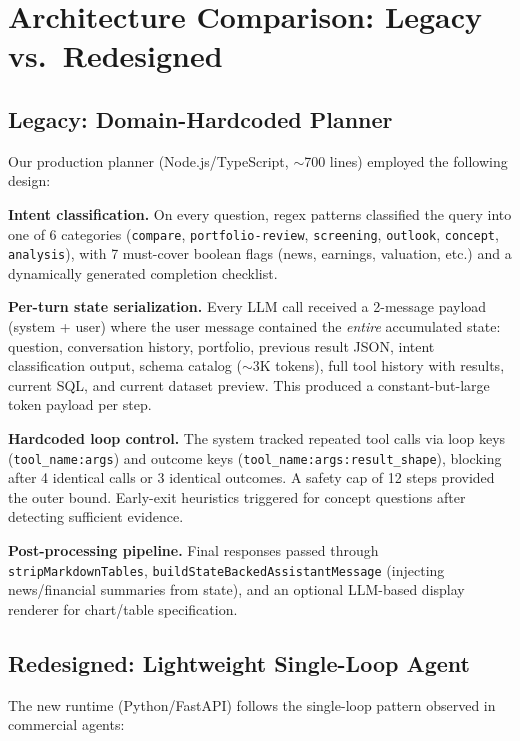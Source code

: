 \documentclass{article}
\begin{document}
\section{Architecture Comparison: Legacy vs.\ Redesigned}

\subsection{Legacy: Domain-Hardcoded Planner}

Our production planner (Node.js/TypeScript, ${\sim}$700 lines) employed the following design:

\textbf{Intent classification.}
On every question, regex patterns classified the query into one of 6 categories (\texttt{compare}, \texttt{portfolio-review}, \texttt{screening}, \texttt{outlook}, \texttt{concept}, \texttt{analysis}), with 7 must-cover boolean flags (news, earnings, valuation, etc.) and a dynamically generated completion checklist.

\textbf{Per-turn state serialization.}
Every LLM call received a 2-message payload (system + user) where the user message contained the \emph{entire} accumulated state: question, conversation history, portfolio, previous result JSON, intent classification output, schema catalog (${\sim}$3K tokens), full tool history with results, current SQL, and current dataset preview. This produced a constant-but-large token payload per step.

\textbf{Hardcoded loop control.}
The system tracked repeated tool calls via loop keys (\texttt{tool\_name:args}) and outcome keys (\texttt{tool\_name:args:result\_shape}), blocking after 4 identical calls or 3 identical outcomes. A safety cap of 12 steps provided the outer bound. Early-exit heuristics triggered for concept questions after detecting sufficient evidence.

\textbf{Post-processing pipeline.}
Final responses passed through \texttt{stripMarkdownTables}, \texttt{buildStateBackedAssistantMessage} (injecting news/financial summaries from state), and an optional LLM-based display renderer for chart/table specification.

\subsection{Redesigned: Lightweight Single-Loop Agent}

The new runtime (Python/FastAPI) follows the single-loop pattern observed in commercial agents:
\end{document}
